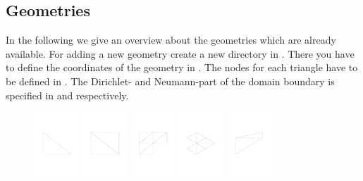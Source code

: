\subsection{Geometries}
\label{sect:ImplementedProblems_Geometries}

In the following we give an overview about the geometries which are already available. For adding a new geometry create a new directory  in . There you have to define the coordinates of the geometry in . The nodes for each triangle have to be defined in . The Dirichlet- and Neumann-part of the domain boundary is specified in  and  respectively.

\begin{figure}[h!]
\includegraphics[width=0.15\textwidth]{images/sect_ImplementedProblems_Triangle.pdf}
\includegraphics[width=0.15\textwidth]{images/sect_ImplementedProblems_Square.pdf}
\includegraphics[width=0.15\textwidth]{images/sect_ImplementedProblems_Lshape.pdf}
\includegraphics[width=0.15\textwidth]{images/sect_ImplementedProblems_Lshape3.pdf}
\includegraphics[width=0.15\textwidth]{images/sect_ImplementedProblems_Cooks.pdf}

\end{figure}
